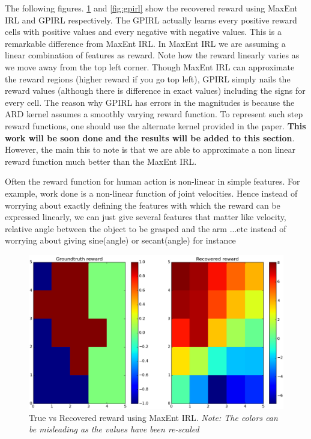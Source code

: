 \documentclass{article}[11pt]
\begin{document}
The following figures. \ref{fig:max} and \ref{fig:gpirl} show the recovered reward using MaxEnt IRL and GPIRL respectively. The GPIRL actually learns every positive reward cells with positive values and every negative with negative values. This is a remarkable difference from MaxEnt IRL. In MaxEnt IRL we are assuming a linear combination of features as reward. Note how the reward linearly varies as we move away from the top left corner. Though MaxEnt IRL can approximate the reward regions (higher reward if you go top left), GPIRL simply nails the reward values (although there is difference in exact values) including the signs for every cell. The reason why GPIRL has errors in the magnitudes is because the ARD kernel assumes a smoothly varying reward function. To represent such step reward functions, one should use the alternate kernel provided in the paper. \textbf{This work will be soon done and the results will be added to this section}. However, the main this to note is that we are able to approximate a non linear reward function much better than the MaxEnt IRL. 

Often the reward function for human action is non-linear in simple features. For example, work done is a non-linear function of joint velocities. Hence instead of worrying about exactly defining the features with which the reward can be expressed linearly, we can just give several features that matter like velocity, relative angle between the object to be grasped and the arm ...etc instead of worrying about giving sine(angle) or secant(angle) for instance



 \begin{figure}[H]
  \begin{center}
    \includegraphics[width=1\linewidth]{images/maxent_results}
    \caption{True vs Recovered reward using MaxEnt IRL. \textit{Note: The colors can be misleading as the values have been re-scaled}}
    \label{fig:max}
  \end{center}
\end{figure}
\end{document}
